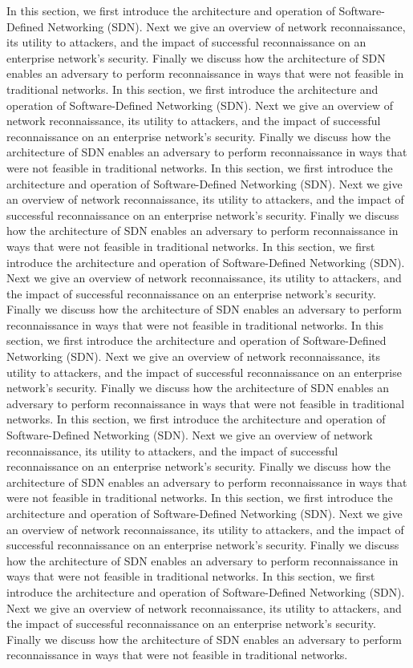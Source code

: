In this section, we first introduce the architecture and operation of
Software-Defined Networking (SDN). Next we give an overview of network 
reconnaissance, its utility to attackers, and the impact of successful
reconnaissance on an enterprise network's security. Finally  we discuss
how the architecture of SDN enables an adversary to perform reconnaissance 
in ways that were not feasible in traditional networks. 
In this section, we first introduce the architecture and operation of
Software-Defined Networking (SDN). Next we give an overview of network 
reconnaissance, its utility to attackers, and the impact of successful
reconnaissance on an enterprise network's security. Finally  we discuss
how the architecture of SDN enables an adversary to perform reconnaissance 
in ways that were not feasible in traditional networks. 
In this section, we first introduce the architecture and operation of
Software-Defined Networking (SDN). Next we give an overview of network 
reconnaissance, its utility to attackers, and the impact of successful
reconnaissance on an enterprise network's security. Finally  we discuss
how the architecture of SDN enables an adversary to perform reconnaissance 
in ways that were not feasible in traditional networks. 
In this section, we first introduce the architecture and operation of
Software-Defined Networking (SDN). Next we give an overview of network 
reconnaissance, its utility to attackers, and the impact of successful
reconnaissance on an enterprise network's security. Finally  we discuss
how the architecture of SDN enables an adversary to perform reconnaissance 
in ways that were not feasible in traditional networks. 
In this section, we first introduce the architecture and operation of
Software-Defined Networking (SDN). Next we give an overview of network 
reconnaissance, its utility to attackers, and the impact of successful
reconnaissance on an enterprise network's security. Finally  we discuss
how the architecture of SDN enables an adversary to perform reconnaissance 
in ways that were not feasible in traditional networks. In this section, we first introduce the architecture and operation of
Software-Defined Networking (SDN). Next we give an overview of network 
reconnaissance, its utility to attackers, and the impact of successful
reconnaissance on an enterprise network's security. Finally  we discuss
how the architecture of SDN enables an adversary to perform reconnaissance 
in ways that were not feasible in traditional networks. 
In this section, we first introduce the architecture and operation of
Software-Defined Networking (SDN). Next we give an overview of network 
reconnaissance, its utility to attackers, and the impact of successful
reconnaissance on an enterprise network's security. Finally  we discuss
how the architecture of SDN enables an adversary to perform reconnaissance 
in ways that were not feasible in traditional networks. 
In this section, we first introduce the architecture and operation of
Software-Defined Networking (SDN). Next we give an overview of network 
reconnaissance, its utility to attackers, and the impact of successful
reconnaissance on an enterprise network's security. Finally  we discuss
how the architecture of SDN enables an adversary to perform reconnaissance 
in ways that were not feasible in traditional networks. 


